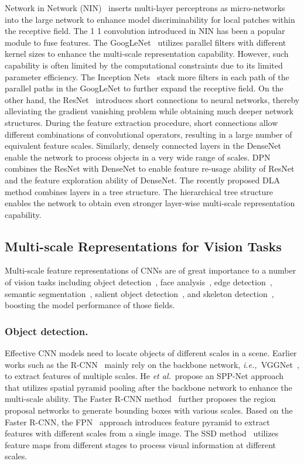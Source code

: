 \documentclass[10pt,journal,cspaper,compsoc]{IEEEtran}
\newcommand{\myPara}[1]{\subsubsection{#1}}
\def\ie{\emph{i.e.,~}}
\def\etal{{\em et al.}}
\def\etal{{\em et al.}}
\begin{document}
Network in Network (NIN)~\cite{lin2013network} inserts multi-layer 
perceptrons as micro-networks into the large network 
to enhance model discriminability for local patches within the receptive field.
The 1  1 convolution introduced in NIN has been a popular module to fuse features.
The GoogLeNet~\cite{szegedy2015going}
utilizes parallel filters with different kernel sizes
to enhance the multi-scale representation capability.
However, such capability is often limited by the computational constraints
due to its limited parameter efficiency.
The Inception Nets~\cite{szegedy2016rethinking,szegedy2017inception}
stack more filters in each path of the parallel paths in the GoogLeNet
to further expand the receptive field.
On the other hand, the ResNet~\cite{he2016deep} introduces short connections
to neural networks,
thereby alleviating the gradient vanishing problem while
obtaining much deeper network structures.
During the feature extraction procedure,
short connections allow different combinations of convolutional operators,
resulting in a large number of equivalent feature scales.
Similarly, densely connected layers in the DenseNet~\cite{huang2017densely}
enable the network to process objects in a very wide range of scales.
DPN~\cite{chen2017dual} combines the ResNet with DenseNet to 
enable feature re-usage ability of ResNet and the feature exploration 
ability of DenseNet.
The recently proposed DLA~\cite{yu2018deep} method combines layers in a 
tree structure.
The hierarchical tree structure enables the network to obtain even stronger
layer-wise multi-scale representation capability.


\subsection{Multi-scale Representations for Vision Tasks}

Multi-scale feature representations of CNNs are of great importance to
a number of vision tasks including object detection~\cite{ren2015faster},
face analysis~\cite{bulat2017far,najibi2017ssh},
edge detection~\cite{liu2017richer},
semantic segmentation~\cite{chen2018deeplab},
salient object detection~\cite{Liu2019PoolSal,Zhao2019RgbdSal}, 
and skeleton detection~\cite{zhao2018hifi},
boosting the model performance of those fields.


\myPara{Object detection.}
Effective CNN models need to locate objects of different scales in a scene.
Earlier works such as the R-CNN~\cite{girshick2014rich} mainly rely on
the backbone network, \ie VGGNet~\cite{simonyan2014very},
to extract features of multiple scales.
He \etal~propose an SPP-Net approach~\cite{he2015spatial} that utilizes
spatial pyramid pooling after the backbone network
to enhance the multi-scale ability.
The Faster R-CNN method~\cite{ren2015faster} further proposes
the region proposal networks to generate bounding boxes with various scales.
Based on the Faster R-CNN, the FPN~\cite{lin2017feature} approach 
introduces feature pyramid
to extract features with different scales from a single image.
The SSD method~\cite{liu2016ssd} utilizes feature maps from different stages
to process visual information at different scales.
\end{document}
